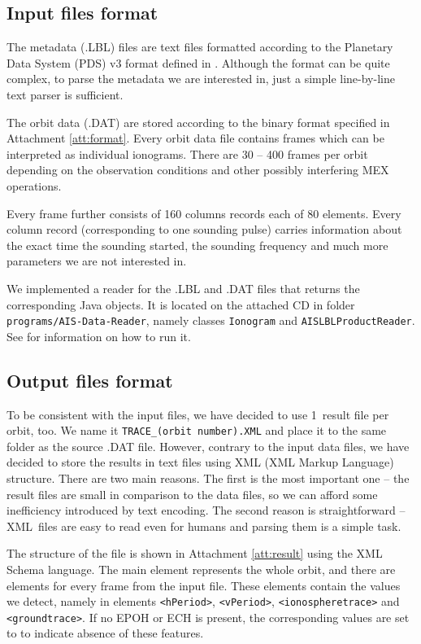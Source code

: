 \subsection{Input files format}
The metadata (.LBL) files are text files formatted according to the Planetary Data System (PDS) v3 format defined in \citep{JPL2009}. Although the format can be quite complex, to parse the metadata we are interested in, just a simple line-by-line text parser is sufficient.

The orbit data (.DAT) are stored according to the binary format specified in Attachment \ref{att:format}. Every orbit data file contains frames which can be interpreted as individual ionograms. There are 30 -- 400 frames per orbit depending on the observation conditions and other possibly interfering MEX operations. 

Every frame further consists of 160 columns records each of 80 elements. Every column record (corresponding to one sounding pulse) carries information about the exact time the sounding started, the sounding frequency and much more parameters we are not interested in.

We implemented a reader for the .LBL and .DAT files that re\-turns the corresponding Java objects. It is located on the attached CD in folder \texttt{programs/AIS-Data-Reader}, namely classes \texttt{Ionogram} and \texttt{AISLBLProductReader}. See  for information on how to run it.

\subsection{Output files format}
To be consistent with the input files, we have decided to use 1~result file per orbit, too. We name it \texttt{TRACE\_(orbit number).XML} and place it to the same folder as the source .DAT file. However, contrary to the input data files, we have decided to store the results in text files using XML (XML Markup Language) structure. There are two main reasons. The first is the most important one -- the result files are small in comparison to the data files, so we can afford some inefficiency introduced by text encoding. The second reason is straightforward -- XML~files are easy to read even for humans and parsing them is a simple task.

The structure of the file is shown in Attachment \ref{att:result} using the XML Schema language. The main element represents the whole orbit, and there are elements for every frame from the input file. These elements contain the values we detect, namely in elements \texttt{<hPeriod>}, \texttt{<vPeriod>}, \texttt{<ionospheretrace>} and \texttt{<groundtrace>}. If no EPOH or ECH is present, the corresponding values are set to  to indicate absence of these features.

